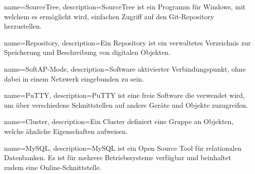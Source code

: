{
  name=SourceTree,
  description={SourceTree ist ein Programm für Windows, mit welchem es ermöglicht wird, einfachen Zugriff auf den Git-Repository herzustellen. \cite{sourceTree}}
}

{
  name=Repository,
  description={Ein Repository ist ein verwaltetes Verzeichnis zur Speicherung und Beschreibung von digitalen Objekten.  \cite{rep}}
}

{
  name=SoftAP-Mode,
  description={Software aktivierter Verbindungspunkt, ohne dabei in einem Netzwerk eingebunden zu sein.}
}

{
  name=PuTTY,
  description={PuTTY ist eine freie Software die verwendet wird, um über verschiedene Schnittstellen auf andere Geräte und Objekte zuzugreifen.  \cite{putt}}
}

{
  name=Cluster,
  description={Ein Cluster definiert eine Gruppe an Objekten, welche ähnliche Eigenschaften aufweisen.  \cite{cluster}}
}

{
  name=MySQL,
  description={MySQL ist ein Open Source Tool für relationalen Datenbanken. Es ist für mehrere Betriebssysteme verfügbar und beinhaltet zudem eine Online-Schnittstelle. \cite{mySQL}}
}


\glsaddall

\printglossary[style=super, nonumberlist]

